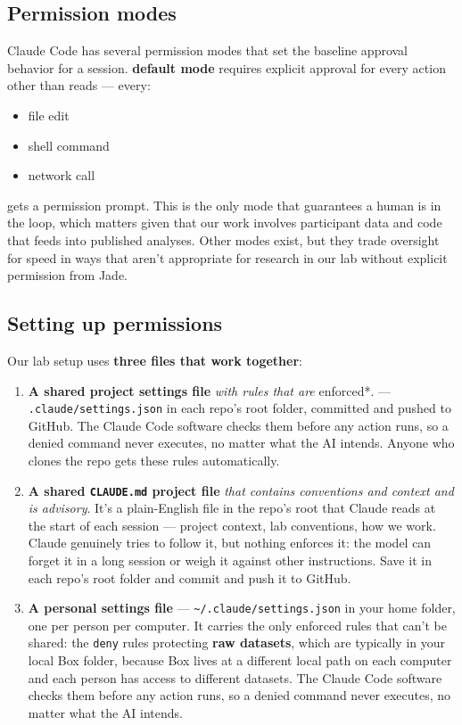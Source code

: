 \documentclass[
]{book}
\providecommand{\tightlist}{%
  \setlength{\itemsep}{0pt}\setlength{\parskip}{0pt}}
\begin{document}
\subsection{Permission modes}\label{permission-modes}

Claude Code has several permission modes that set the baseline approval
behavior for a session. \textbf{default mode} requires explicit approval for
every action other than reads --- every:

\begin{itemize}
\tightlist
\item
  file edit
\item
  shell command
\item
  network call
\end{itemize}

gets a permission prompt. This is the only mode that guarantees a human
is in the loop, which matters given that our work involves participant
data and code that feeds into published analyses. Other modes exist, but
they trade oversight for speed in ways that aren't appropriate for
research in our lab without explicit permission from Jade.

\subsection{Setting up permissions}\label{setting-up-permissions}

Our lab setup uses \textbf{three files that work together}:

\begin{enumerate}
\def\labelenumi{\arabic{enumi}.}
\tightlist
\item
  \textbf{A shared project settings file} \emph{with rules that are }enforced*. --- \texttt{.claude/settings.json} in
  each repo's root folder, committed and pushed to GitHub. The
  Claude Code software checks them before any action runs, so a denied
  command never executes, no matter what the AI intends. Anyone who clones the repo gets
  these rules automatically.
\item
  \textbf{A shared \texttt{CLAUDE.md} project file} \emph{that contains conventions and context and is advisory}. It's a plain-English file in the
  repo's root that Claude reads at the start of each session ---
  project context, lab conventions, how we work. Claude genuinely
  tries to follow it, but nothing enforces it: the model can forget it
  in a long session or weigh it against other instructions. Save it in each repo's
  root folder and commit and push it to GitHub.
\item
  \textbf{A personal settings file} --- \texttt{\textasciitilde{}/.claude/settings.json} in your
  home folder, one per person per computer. It carries the only
  enforced rules that can't be shared: the \texttt{deny} rules protecting
  \textbf{raw datasets}, which are typically in your local Box folder, because Box lives at a
  different local path on each computer and each person has access to
  different datasets. The
  Claude Code software checks them before any action runs, so a denied
  command never executes, no matter what the AI intends.
\end{enumerate}
\end{document}
